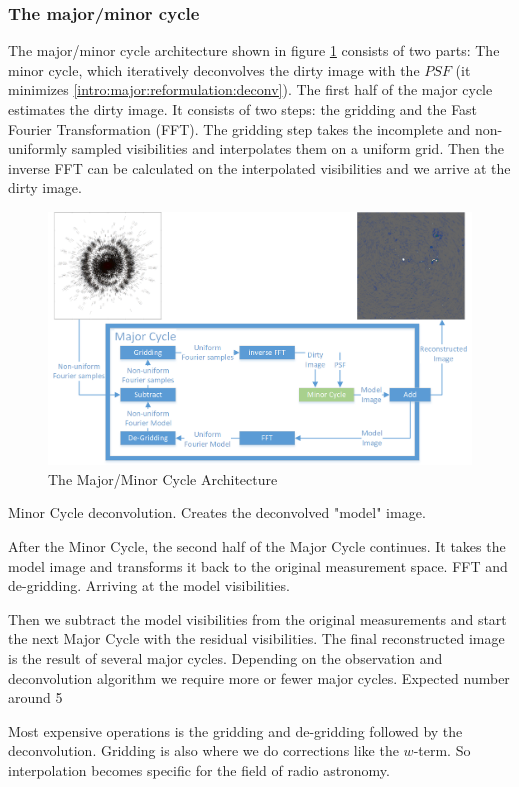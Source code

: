 \subsubsection{The major/minor cycle}
The major/minor cycle architecture shown in figure \ref{intro:major:fig} consists of two parts: The minor cycle, which iteratively deconvolves the dirty image with the $PSF$ (it minimizes \eqref{intro:major:reformulation:deconv}). The first half of the major cycle estimates the dirty image. It consists of two steps: the gridding and the Fast Fourier Transformation (FFT). The gridding step takes the incomplete and non-uniformly sampled visibilities and interpolates them on a uniform grid. Then the inverse FFT can be calculated on the interpolated visibilities and we arrive at the dirty image.

\begin{figure}[h]
	\centering
	\includegraphics[width=0.90\linewidth]{./chapters/02.hypo/Major-Minor3.png}
	\caption{The Major/Minor Cycle Architecture}
	\label{intro:major:fig}
\end{figure}

Minor Cycle deconvolution. Creates the deconvolved "model" image.

After the Minor Cycle, the second half of the Major Cycle continues. It takes the model image and transforms it back to the original measurement space. FFT and de-gridding. Arriving at the model visibilities.

Then we subtract the model visibilities from the original measurements and start the next Major Cycle with the residual visibilities. The final reconstructed image is the result of several major cycles. Depending on the observation and deconvolution algorithm we require more or fewer major cycles. Expected number around 5

Most expensive operations is the gridding and de-gridding followed by the deconvolution. Gridding is also where we do corrections like the $w$-term. So interpolation becomes specific for the field of radio astronomy.

